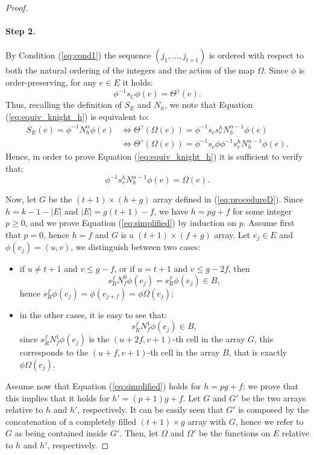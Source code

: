 \documentclass{amsart}
\theoremstyle{definition}
\numberwithin{equation}{section}
\begin{document}
\begin{proof}
\paragraph{\textbf{Step 2.}} 
By Condition (\ref{eq:cond1}) the sequence $(j_1,\dotsc, j_{t+1})$ is  ordered with respect to both the natural ordering of the integers and  the action of the map $\Omega$. Since $\phi$ is order-preserving, for any $e \in E$ it holds:
\[
	\phi^{-1} s_C \phi (e) = \Theta^\gamma(e).
\]
Thus, recalling the definition of $S_E$ and $N_h$, we note that Equation (\ref{eq:equiv_knight_h}) is equivalent to:
\[
\begin{aligned}
S_E(e) = \phi^{-1}N_h^\alpha\phi(e) &\Leftrightarrow  \Theta^\gamma(\Omega(e))  =  \phi^{-1}s_c s_r^h N_h^{\alpha-1}\phi(e) \\
& \Leftrightarrow \Theta^\gamma(\Omega(e))  =  \phi^{-1}s_c \phi \phi^{-1} s_r^h N_h^{\alpha-1}\phi(e).
\end{aligned}
\]
Hence, in order to prove Equation (\ref{eq:equiv_knight_h}) it is sufficient to verify that:
\begin{equation} \label{eq:simplified}
\phi^{-1} s_r^hN_h^{\alpha-1} \phi (e) = \Omega(e).
\end{equation}

Now, let $G$ be the $(t+1)\times (h+g)$ array defined in (\ref{eq:procedureD}).
Since $h=k-1-|E|$ and $|E|=g(t+1)-f$, we have $h = pg+f$ for some integer $p\geq0$, and  we prove Equation (\ref{eq:simplified}) by induction on $p$.
Assume first that $p=0$, hence $h=f$ and $G$ is a $(t+1)\times (f+g)$ array. Let $e_j \in E$ and $\phi(e_j) = (u,v)$, we distinguish between two cases:
\begin{itemize}
	\item if $u \neq t+1$ and $v\leq g-f$, or if $u = t+1$ and  $v\leq g-2f$, then
	\[
			s_R^f N_f^0\phi(e_j)  = s_R^f\phi(e_j) \in B,
	\]
	hence  $s_R^f\phi(e_j) = \phi(e_{j+f}) = \phi\Omega(e_{j})$;
	\item in the other cases, it is easy to see that:
	\[
s_R^f N_f^1\phi(e_j) \in B,
	\]
	since $s_R^f N_f^1\phi(e_j)$ is the $ (u+2f,v+1)$-th cell in the array $G$, this corresponds to the $(u+f,v+1)$-th cell in the array $B$, that is exactly $\phi\Omega(e_j)$.
\end{itemize}

Assume now that Equation (\ref{eq:simplified}) holds for $h = pg+f$; we prove that this implies that it holds for $h'= (p+1)g+f$. Let $G$ and $G'$ be the two arrays relative to $h$ and $h'$, respectively. It can be easily seen that $G'$ is composed by the concatenation of a completely filled $(t+1)\times g$ array with $G$, hence we refer to $G$ as being contained inside $G'$. Then, let $\Omega$ and $\Omega'$ be the functions on $E$ relative to $h$ and $h'$, respectively.



\end{proof}
\end{document}
